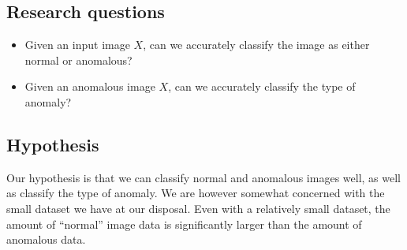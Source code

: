 \subsection{Research questions}

\begin{itemize}
    \item Given an input image $X$, can we accurately classify the image as either normal or anomalous?
    \item Given an anomalous image $X$, can we accurately classify the type of anomaly?
\end{itemize}

\subsection{Hypothesis}

Our hypothesis is that we can classify normal and anomalous images well, as well as classify the type of anomaly. We are however somewhat concerned with the small dataset we have at our disposal. Even with a relatively small dataset, the amount of ``normal'' image data is significantly larger than the amount of anomalous data. 